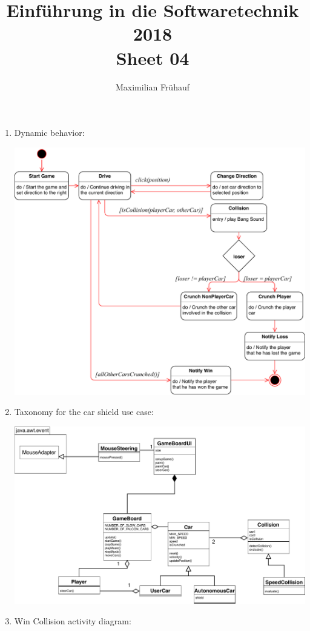 \documentclass[a4paper, 10pt]{article}
\title{Einführung in die Softwaretechnik 2018 \\ Sheet 04}
\author{Maximilian Frühauf}
\begin{document}
\maketitle
\begin{enumerate}
    \item Dynamic behavior:

    \includegraphics[width=\linewidth]{StateChart.pdf}

    \item Taxonomy for the car shield use case:

    \includegraphics[width=\linewidth]{ClassDiagram.pdf}

    \item Win Collision activity diagram:


\end{enumerate}
\end{document}
